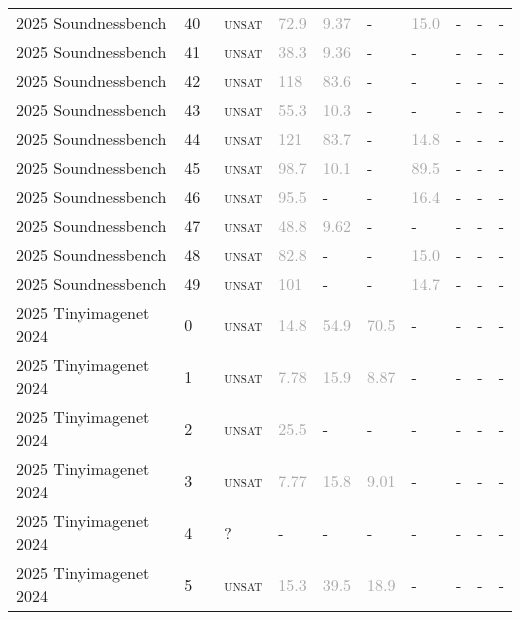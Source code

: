 \begin{center}
{\begin{longtable}{@{}llllllllll@{}}
2025 Soundnessbench & 40 & ~\textsc{unsat} & \textcolor{darkgray}{72.9} & \textcolor{darkgray}{9.37} & - & \textcolor{darkgray}{15.0} & - & - & - \\
2025 Soundnessbench & 41 & ~\textsc{unsat} & \textcolor{darkgray}{38.3} & \textcolor{darkgray}{9.36} & - & - & - & - & - \\
2025 Soundnessbench & 42 & ~\textsc{unsat} & \textcolor{darkgray}{118} & \textcolor{darkgray}{83.6} & - & - & - & - & - \\
2025 Soundnessbench & 43 & ~\textsc{unsat} & \textcolor{darkgray}{55.3} & \textcolor{darkgray}{10.3} & - & - & - & - & - \\
2025 Soundnessbench & 44 & ~\textsc{unsat} & \textcolor{darkgray}{121} & \textcolor{darkgray}{83.7} & - & \textcolor{darkgray}{14.8} & - & - & - \\
2025 Soundnessbench & 45 & ~\textsc{unsat} & \textcolor{darkgray}{98.7} & \textcolor{darkgray}{10.1} & - & \textcolor{darkgray}{89.5} & - & - & - \\
2025 Soundnessbench & 46 & ~\textsc{unsat} & \textcolor{darkgray}{95.5} & - & - & \textcolor{darkgray}{16.4} & - & - & - \\
2025 Soundnessbench & 47 & ~\textsc{unsat} & \textcolor{darkgray}{48.8} & \textcolor{darkgray}{9.62} & - & - & - & - & - \\
2025 Soundnessbench & 48 & ~\textsc{unsat} & \textcolor{darkgray}{82.8} & - & - & \textcolor{darkgray}{15.0} & - & - & - \\
2025 Soundnessbench & 49 & ~\textsc{unsat} & \textcolor{darkgray}{101} & - & - & \textcolor{darkgray}{14.7} & - & - & - \\
\midrule
2025 Tinyimagenet 2024 & 0 & ~\textsc{unsat} & \textcolor{darkgray}{14.8} & \textcolor{darkgray}{54.9} & \textcolor{darkgray}{70.5} & - & - & - & - \\
2025 Tinyimagenet 2024 & 1 & ~\textsc{unsat} & \textcolor{darkgray}{7.78} & \textcolor{darkgray}{15.9} & \textcolor{darkgray}{8.87} & - & - & - & - \\
2025 Tinyimagenet 2024 & 2 & ~\textsc{unsat} & \textcolor{darkgray}{25.5} & - & - & - & - & - & - \\
2025 Tinyimagenet 2024 & 3 & ~\textsc{unsat} & \textcolor{darkgray}{7.77} & \textcolor{darkgray}{15.8} & \textcolor{darkgray}{9.01} & - & - & - & - \\
2025 Tinyimagenet 2024 & 4 & ~? & - & - & - & - & - & - & - \\
2025 Tinyimagenet 2024 & 5 & ~\textsc{unsat} & \textcolor{darkgray}{15.3} & \textcolor{darkgray}{39.5} & \textcolor{darkgray}{18.9} & - & - & - & - \\

\end{longtable}}
\end{center}
